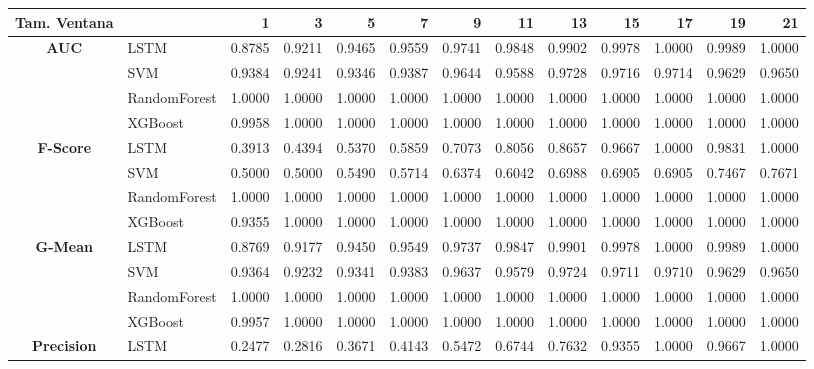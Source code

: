 \begin{table}[h]
\centering
\begin{adjustbox}{max width=15cm}
	\begin{tabular}{|c|l|r|r|r|r|r|r|r|r|r|r|r|}
		\hline
		\textbf{Tam. Ventana} &         &      1  &      3  &      5  &      7  &      9  &      11 &      13 &      15 &      17 &      19 &      21 \\
		\hline
		\textbf{AUC} & LSTM &  0.8785 &  0.9211 &  0.9465 &  0.9559 &  0.9741 &  0.9848 &  0.9902 &  0.9978 &  1.0000 &  0.9989 &  1.0000 \\
		& SVM &  0.9384 &  0.9241 &  0.9346 &  0.9387 &  0.9644 &  0.9588 &  0.9728 &  0.9716 &  0.9714 &  0.9629 &  0.9650 \\
		& RandomForest &  1.0000 &  1.0000 &  1.0000 &  1.0000 &  1.0000 &  1.0000 &  1.0000 &  1.0000 &  1.0000 &  1.0000 &  1.0000 \\
		& XGBoost &  0.9958 &  1.0000 &  1.0000 &  1.0000 &  1.0000 &  1.0000 &  1.0000 &  1.0000 &  1.0000 &  1.0000 &  1.0000 \\
		\hline
		\textbf{F-Score} & LSTM &  0.3913 &  0.4394 &  0.5370 &  0.5859 &  0.7073 &  0.8056 &  0.8657 &  0.9667 &  1.0000 &  0.9831 &  1.0000 \\
		& SVM &  0.5000 &  0.5000 &  0.5490 &  0.5714 &  0.6374 &  0.6042 &  0.6988 &  0.6905 &  0.6905 &  0.7467 &  0.7671 \\
		& RandomForest &  1.0000 &  1.0000 &  1.0000 &  1.0000 &  1.0000 &  1.0000 &  1.0000 &  1.0000 &  1.0000 &  1.0000 &  1.0000 \\
		& XGBoost &  0.9355 &  1.0000 &  1.0000 &  1.0000 &  1.0000 &  1.0000 &  1.0000 &  1.0000 &  1.0000 &  1.0000 &  1.0000 \\
		\hline
		\textbf{G-Mean} & LSTM &  0.8769 &  0.9177 &  0.9450 &  0.9549 &  0.9737 &  0.9847 &  0.9901 &  0.9978 &  1.0000 &  0.9989 &  1.0000 \\
		& SVM &  0.9364 &  0.9232 &  0.9341 &  0.9383 &  0.9637 &  0.9579 &  0.9724 &  0.9711 &  0.9710 &  0.9629 &  0.9650 \\
		& RandomForest &  1.0000 &  1.0000 &  1.0000 &  1.0000 &  1.0000 &  1.0000 &  1.0000 &  1.0000 &  1.0000 &  1.0000 &  1.0000 \\
		& XGBoost &  0.9957 &  1.0000 &  1.0000 &  1.0000 &  1.0000 &  1.0000 &  1.0000 &  1.0000 &  1.0000 &  1.0000 &  1.0000 \\
		\hline
		\textbf{Precision} & LSTM &  0.2477 &  0.2816 &  0.3671 &  0.4143 &  0.5472 &  0.6744 &  0.7632 &  0.9355 &  1.0000 &  0.9667 &  1.0000 \\

\end{tabular}
\end{adjustbox}
\end{table}
